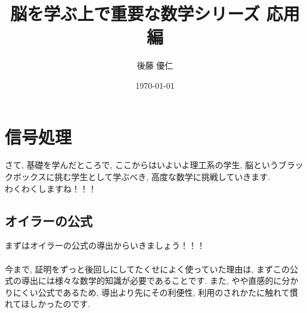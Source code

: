 \documentclass[11pt,a4paper]{jreport}
\title{脳を学ぶ上で重要な数学シリーズ 応用編}
\author{後藤 優仁}
\date{\today}
\begin{document}
\maketitle
%
%
\tableofcontents


\chapter{信号処理}

さて, 基礎を学んだところで, ここからはいよいよ理工系の学生, 脳というブラックボックスに挑む学生として学ぶべき, 高度な数学に挑戦していきます.\\ 
わくわくしますね！！！\\
\section{オイラーの公式 \label{euler}}
まずはオイラーの公式の導出からいきましょう！！！\\
\\
今まで, 証明をずっと後回しにしてたくせによく使っていた理由は, まずこの公式の導出には様々な数学的知識が必要であることです. また, やや直感的に分かりにくい公式であるため, 導出より先にその利便性, 利用のされかたに触れて慣れてほしかったのです.\\
\end{document}
